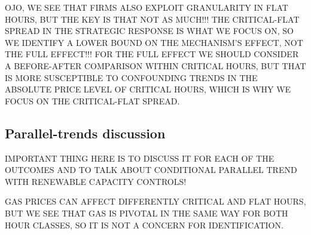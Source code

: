 \documentclass[11pt,a4paper]{article}
\begin{document}
OJO, WE SEE THAT FIRMS ALSO EXPLOIT GRANULARITY IN FLAT HOURS, BUT THE KEY IS THAT NOT AS MUCH!!! THE CRITICAL-FLAT SPREAD IN THE STRATEGIC RESPONSE IS WHAT WE FOCUS ON, SO WE IDENTIFY A LOWER BOUND ON THE MECHANISM'S EFFECT, NOT THE FULL EFFECT!!! FOR THE FULL EFFECT WE SHOULD CONSIDER A BEFORE-AFTER COMPARISON WITHIN CRITICAL HOURS, BUT THAT IS MORE SUSCEPTIBLE TO CONFOUNDING TRENDS IN THE ABSOLUTE PRICE LEVEL OF CRITICAL HOURS, WHICH IS WHY WE FOCUS ON THE CRITICAL-FLAT SPREAD.



\subsection{Parallel-trends discussion}\label{sec:data:pta}

IMPORTANT THING HERE IS TO DISCUSS IT FOR EACH OF THE OUTCOMES AND TO TALK ABOUT CONDITIONAL PARALLEL TREND WITH RENEWABLE CAPACITY CONTROLS!

GAS PRICES CAN AFFECT DIFFERENTLY CRITICAL AND FLAT HOURS, BUT WE SEE THAT GAS IS PIVOTAL IN THE SAME WAY FOR BOTH HOUR CLASSES, SO IT IS NOT A CONCERN FOR IDENTIFICATION. 

\begin{table}[H]
\centering
\caption{\textbf{Price-setting technology by hour-class, October--December 2025 (post-MTU15-DA).} For each (date, period) the price-setting technology is the one whose accepted sell tranche has the highest bid price (i.e., the tranche that determines the uniform clearing price). Table reports the share of (date, period) cells in each hour-class where each technology is the price-setter.}
\label{tab:marg_tech_post}

\end{table}

\begin{table}[H]
\centering
\caption{\textbf{Price-setting technology by hour-class, October--December 2024 (pre-MTU15-DA).} Same construction as Table~\ref{tab:marg_tech_post}.}
\label{tab:marg_tech_pre}

\end{table}
\end{document}
